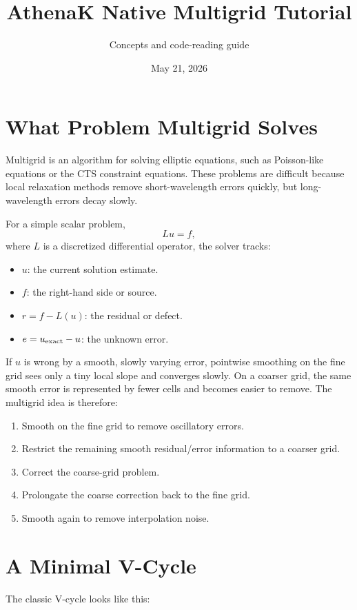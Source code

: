 \documentclass[11pt]{article}
\title{AthenaK Native Multigrid Tutorial}
\author{Concepts and code-reading guide}
\date{May 21, 2026}
\begin{document}
\maketitle

\section{What Problem Multigrid Solves}

Multigrid is an algorithm for solving elliptic equations, such as Poisson-like
equations or the CTS constraint equations.  These problems are difficult because
local relaxation methods remove short-wavelength errors quickly, but long-
wavelength errors decay slowly.

For a simple scalar problem,
\[
  L u = f,
\]
where \(L\) is a discretized differential operator, the solver tracks:
\begin{itemize}
  \item \(u\): the current solution estimate.
  \item \(f\): the right-hand side or source.
  \item \(r = f - L(u)\): the residual or defect.
  \item \(e = u_{\rm exact}-u\): the unknown error.
\end{itemize}

If \(u\) is wrong by a smooth, slowly varying error, pointwise smoothing on the
fine grid sees only a tiny local slope and converges slowly.  On a coarser grid,
the same smooth error is represented by fewer cells and becomes easier to remove.
The multigrid idea is therefore:
\begin{enumerate}
  \item Smooth on the fine grid to remove oscillatory errors.
  \item Restrict the remaining smooth residual/error information to a coarser
        grid.
  \item Correct the coarse-grid problem.
  \item Prolongate the coarse correction back to the fine grid.
  \item Smooth again to remove interpolation noise.
\end{enumerate}

\section{A Minimal V-Cycle}

The classic V-cycle looks like this:
\end{document}
